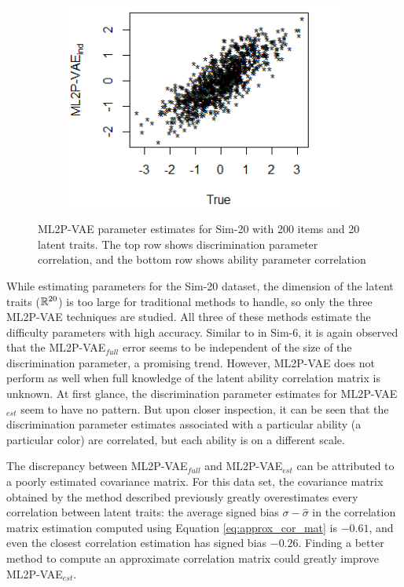 \begin{figure}[h]
\begin{subfigure}{.32\textwidth}
    \end{subfigure}
    \begin{subfigure}{.32\textwidth}
      \centering
      \includegraphics[width=.9\linewidth]{img/ml_journal_results/20skills/vae_ind_theta_20skills.png}
    \end{subfigure}
    \caption{ML2P-VAE parameter estimates for Sim-20 with 200 items and 20 latent traits. The top row shows discrimination parameter correlation, and the bottom row shows ability parameter correlation}
    \label{fig:20skill_cor}
\end{figure}

While estimating parameters for the Sim-20 dataset, the dimension of the latent traits ($\mathbb{R}^{20}$) is too large for traditional methods to handle, so only the three ML2P-VAE techniques are studied. All three of these methods estimate the difficulty parameters with high accuracy. Similar to in Sim-6, it is again observed that the ML2P-VAE$_{full}$ error seems to be independent of the size of the discrimination parameter, a promising trend. However, ML2P-VAE does not perform as well when full knowledge of the latent ability correlation matrix is unknown. At first glance, the discrimination parameter estimates for ML2P-VAE$_{est}$ seem to have no pattern. But upon closer inspection, it can be seen that the discrimination parameter estimates associated with a particular ability (a particular color) are correlated, but each ability is on a different scale. 

The discrepancy between ML2P-VAE$_{full}$ and ML2P-VAE$_{est}$ can be attributed to a poorly estimated covariance matrix. For this data set, the covariance matrix obtained by the method described previously greatly overestimates every correlation between latent traits: the average signed bias $\sigma - \hat \sigma$ in the correlation matrix estimation computed using Equation \ref{eq:approx_cor_mat} is $-0.61$, and even the closest correlation estimation has signed bias $-0.26$. Finding a better method to compute an approximate correlation matrix could greatly improve ML2P-VAE$_{est}$.

